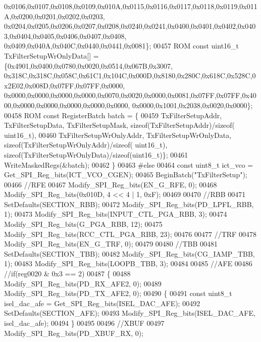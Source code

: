 \begin{DoxyCode}
      0x0106,0x0107,0x0108,0x0109,0x010A,0x0115,0x0116,0x0117,0x0118,0x0119,0x011A,0x0200,0x0201,0x0202,0x0203,
      0x0204,0x0205,0x0206,0x0207,0x0208,0x0240,0x0241,0x0400,0x0401,0x0402,0x0403,0x0404,0x0405,0x0406,0x0407,0x0408,
      0x0409,0x040A,0x040C,0x0440,0x0441,0x0081\};
00457         ROM \textcolor{keyword}{const} uint16\_t TxFilterSetupWrOnlyData[] = \{0x4901,0x0400,0x0780,0x0020,0x0514,0x067B,0x3007,
      0x318C,0x318C,0x058C,0x61C1,0x104C,0x000D,0x8180,0x280C,0x618C,0x528C,0x2E02,0x008D,0x07FF,0x07FF,0x0000,
      0x0000,0x0000,0x0000,0x0000,0x0070,0x0020,0x0000,0x0081,0x07FF,0x07FF,0x4000,0x0000,0x0000,0x0000,0x0000,0x0000,
      0x0000,0x1001,0x2038,0x0020,0x0000\};
00458         ROM \textcolor{keyword}{const} RegisterBatch batch = \{
00459             TxFilterSetupAddr, TxFilterSetupData, TxFilterSetupMask, \textcolor{keyword}{sizeof}(TxFilterSetupAddr)/\textcolor{keyword}{sizeof}(
      uint16\_t),
00460             TxFilterSetupWrOnlyAddr, TxFilterSetupWrOnlyData, \textcolor{keyword}{sizeof}(TxFilterSetupWrOnlyAddr)/\textcolor{keyword}{sizeof}(
      uint16\_t), \textcolor{keyword}{sizeof}(TxFilterSetupWrOnlyData)/\textcolor{keyword}{sizeof}(uint16\_t)\};
00461         WriteMaskedRegs(&batch);
00462     \}
00463 \textcolor{preprocessor}{#else}
00464     \textcolor{keyword}{const} uint8\_t ict\_vco = Get_SPI_Reg_bits(ICT_VCO_CGEN);
00465     BeginBatch(\textcolor{stringliteral}{"TxFilterSetup"});
00466     \textcolor{comment}{//RFE}
00467     Modify_SPI_Reg_bits(EN_G_RFE, 0);
00468     Modify_SPI_Reg_bits(0x010D, 4 << 4 | 1, 0xF);
00469 
00470     \textcolor{comment}{//RBB}
00471     SetDefaults(SECTION_RBB);
00472     Modify_SPI_Reg_bits(PD_LPFL_RBB, 1);
00473     Modify_SPI_Reg_bits(INPUT_CTL_PGA_RBB, 3);
00474     Modify_SPI_Reg_bits(G_PGA_RBB, 12);
00475     Modify_SPI_Reg_bits(RCC_CTL_PGA_RBB, 23);
00476 
00477     \textcolor{comment}{//TRF}
00478     Modify_SPI_Reg_bits(EN_G_TRF, 0);
00479 
00480     \textcolor{comment}{//TBB}
00481     SetDefaults(SECTION_TBB);
00482     Modify_SPI_Reg_bits(CG_IAMP_TBB, 1);
00483     Modify_SPI_Reg_bits(LOOPB_TBB, 3);
00484 
00485     \textcolor{comment}{//AFE}
00486     \textcolor{comment}{//if(reg0020 & 0x3 == 2)}
00487     \{
00488         Modify_SPI_Reg_bits(PD_RX_AFE2, 0);
00489         Modify_SPI_Reg_bits(PD_TX_AFE2, 0);
00490     \{
00491     \textcolor{keyword}{const} uint8\_t isel\_dac\_afe = Get_SPI_Reg_bits(ISEL_DAC_AFE);
00492     SetDefaults(SECTION_AFE);
00493     Modify_SPI_Reg_bits(ISEL_DAC_AFE, isel\_dac\_afe);
00494     \}
00495 
00496     \textcolor{comment}{//XBUF}
00497     Modify_SPI_Reg_bits(PD_XBUF_RX, 0);

\end{DoxyCode}
